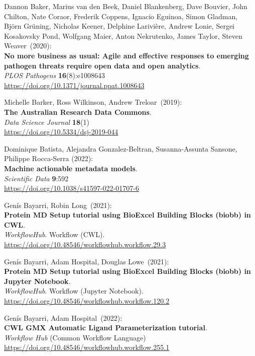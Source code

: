 \begin{thebibliography}{9}
Dannon Baker, Marius van den Beek, Daniel Blankenberg, Dave
Bouvier, John Chilton, Nate Coraor, Frederik Coppens, Ignacio Eguinoa,
Simon Gladman, Björn Grüning, Nicholas Keener, Delphine Larivière,
Andrew Lonie, Sergei Kosakovsky Pond, Wolfgang Maier, Anton Nekrutenko,
James Taylor, Steven Weaver~(2020):\\
\textbf{No more business as usual: Agile and effective responses to
emerging pathogen threats require open data and open analytics}.\\
\emph{PLOS Pathogens} \textbf{16}(8):e1008643 \\
\url{https://doi.org/10.1371/journal.ppat.1008643}

Michelle Barker, Ross Wilkinson, Andrew Treloar~(2019):\\
\textbf{The Australian Research Data Commons}.\\
\emph{Data Science Journal} \textbf{18}(1) \\
\url{https://doi.org/10.5334/dsj-2019-044}

Dominique Batista, Alejandra Gonzalez-Beltran, Susanna-Assunta Sansone, Philippe Rocca-Serra (2022):\\
\textbf{Machine actionable metadata models}.\\
\emph{Scientific Data} \textbf{9}:592 \\
\url{https://doi.org/10.1038/s41597-022-01707-6}

Genís Bayarri, Robin Long~(2021):\\
\textbf{Protein MD Setup tutorial using BioExcel Building Blocks (biobb)
in CWL}.\\
\emph{WorkflowHub}. Workflow (CWL).\\
\url{https://doi.org/10.48546/workflowhub.workflow.29.3}

Genís Bayarri, Adam Hospital, Douglas Lowe~(2021):\\
\textbf{Protein MD Setup tutorial using BioExcel Building Blocks (biobb)
in Jupyter Notebook}.\\
\emph{WorkflowHub}. Workflow (Jupyter Notebook).\\
\url{https://doi.org/10.48546/workflowhub.workflow.120.2}

Genís Bayarri, Adam Hospital~(2022):\\
\textbf{CWL GMX Automatic Ligand Parameterization tutorial}.\\
\emph{Workflow Hub} (Common Workflow Language)\\
\url{https://doi.org/10.48546/workflowhub.workflow.255.1}


\end{thebibliography}
